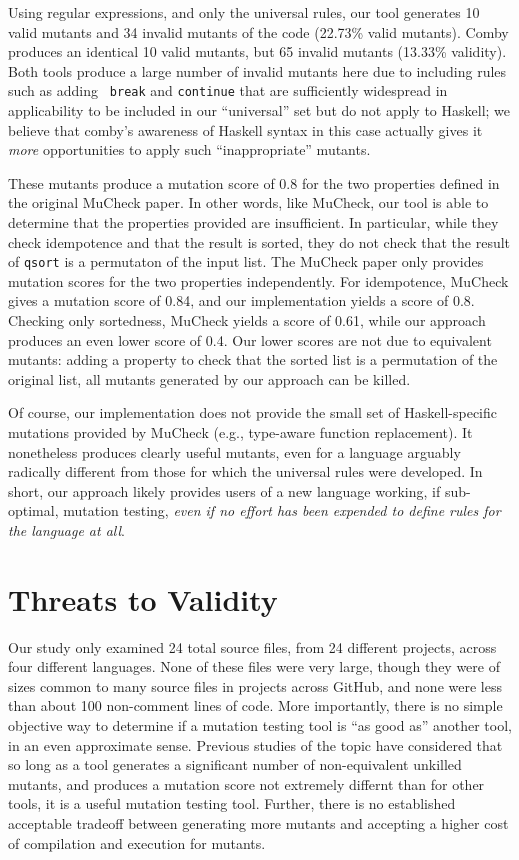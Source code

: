 \documentclass[sigconf,review, anonymous]{acmart}
\begin{document}
{Using regular expressions, and only the universal rules, our tool
generates 10 valid mutants and 34 invalid mutants of the code (22.73\%
valid mutants).  Comby produces an identical 10 valid mutants, but 65
invalid mutants (13.33\% validity).  Both tools produce a large number
of invalid mutants here due to including rules such as adding {\tt
  break} and {\tt continue} that are sufficiently widespread in
applicability to be included in our ``universal'' set but do not apply
to Haskell; we believe that comby's awareness of Haskell syntax in
this case actually gives it \emph{more} opportunities to apply such
``inappropriate'' mutants.

These mutants produce a mutation
score of 0.8 for the two properties defined in the original MuCheck
paper.  In other words, like MuCheck, our tool is able to
determine that the properties provided are insufficient.  In
particular, while they check idempotence and that the result is
sorted, they do not check that the result of {\tt qsort} is a permutaton of the input
list.  The MuCheck paper only provides mutation scores for the two
properties independently.  For idempotence, MuCheck gives a mutation
score of 0.84, and our implementation yields a score of 0.8.  Checking
only sortedness, MuCheck yields a score of 0.61, while our approach
produces an even lower score of 0.4.  Our lower
scores are not due to equivalent mutants: adding a property to check
that the sorted list is a permutation of the original list, all
mutants generated by our approach can be killed.

Of course, our implementation does not provide the small set of Haskell-specific
mutations provided by MuCheck (e.g., type-aware function replacement).  It nonetheless produces clearly useful
mutants, even for a language arguably radically different from those
for which the universal rules were developed.  In short, our approach
likely provides users of a new language working, if sub-optimal, mutation testing,
\emph{even if no effort has been expended to define rules for the
  language at all}.

\section{Threats to Validity}

Our study only examined 24 total source files, from 24 different projects, across four different
languages.  None of these files were very large, though they were of
sizes common to many source files in projects across GitHub, and none
were less than about 100 non-comment lines of code.  More importantly,
there is no simple objective way to determine if a mutation testing
tool is ``as good as'' another tool, in an even approximate sense.
Previous studies of the topic have considered that so long as a tool
generates a significant number of non-equivalent unkilled mutants, and
produces a mutation score not extremely differnt than for other tools,
it is a useful mutation testing tool.  Further, there is no
established acceptable tradeoff between generating more mutants and
accepting a higher cost of compilation and execution for mutants.

}
\end{document}
